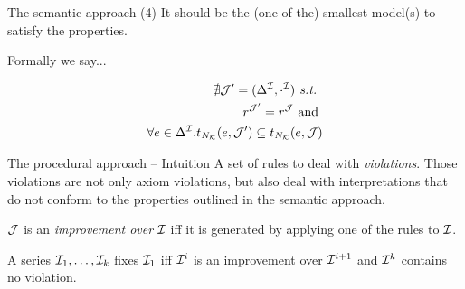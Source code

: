 \documentclass[10pt]{beamer}
\begin{document}
\begin{frame}[fragile]{The semantic approach}
  (4) It should be the (one of the) smallest model(s) to satisfy the properties. \pause
   
  Formally we say... 

  \begin{align*}
    \nexists \mathcal{J}' = (\Delta^{\mathcal{I}}, \cdot^{\mathcal{I}}) \textit{ s.t. } \\
    r^{\mathcal{J}'} = r^{\mathcal{J}} \text{ and } \\ 
    \forall e \in \Delta^{\mathcal{I}}.t_{N_{\mathcal{K}}}({e}, {\mathcal{J}'}) \subseteq t_{N_{\mathcal{K}}}({e}, {\mathcal{J}})
  \end{align*}
\end{frame}

\begin{frame}[fragile]{The procedural approach -- Intuition}
A set of rules to deal with \emph{violations}.
Those violations are not only axiom violations, but also deal with interpretations that do not conform to the properties outlined in the semantic approach.

$\mathcal{J}$ is an \emph{improvement over} $\mathcal{I}$ iff it is generated by applying one of the rules to $\mathcal{I}$.

A series $\mathcal{I}_1, \dots, \mathcal{I}_k$ fixes $\mathcal{I}_1$ iff $\mathcal{I}^{i}$ is an improvement over $\mathcal{I}^{i+1}$ and $\mathcal{I}^{k}$ contains no violation.
\end{frame}
\end{document}
